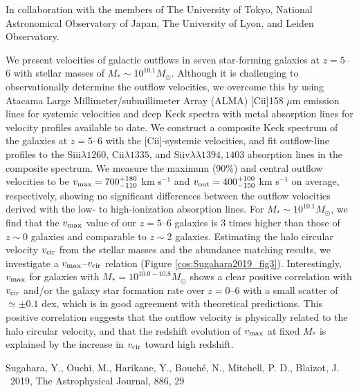 \noindent
In collaboration with the members of
\noindent
The University of Tokyo, 
National Astronomical Observatory of Japan, 
The University of Lyon, 
and 
Leiden Observatory. 

\vspace{10pt}

We present velocities of galactic outflows in seven star-forming galaxies at $z=5$--$6$ 
with stellar masses of $M_\ast \sim10^{10.1} M_\odot$. 
Although it is challenging to observationally determine the outflow velocities, 
we overcome this by using 
Atacama Large Millimeter/submillimeter Array (ALMA)
[{\sc Cii}]158 $\mu$m emission lines for systemic velocities 
and deep Keck spectra with metal absorption lines for velocity profiles available to date. 
We construct a composite Keck spectrum of the galaxies at $z=5$--$6$ 
with the [{\sc Cii}]-systemic velocities, 
and fit outflow-line profiles to the Si{\sc ii}$\lambda1260$, C{\sc ii}$\lambda1335$, 
and Si{\sc iv}$\lambda\lambda1394,1403$ absorption lines in the composite spectrum. 
We measure the maximum (90\%) and central outflow velocities to be 
$v_{\rm max} = 700^{+180}_{-110}$ km s$^{-1}$ 
and $v_{\rm out} = 400^{+100}_{-150}$ km s$^{-1}$ on average, respectively, 
showing no significant differences between the outflow velocities 
derived with the low- to high-ionization absorption lines. 
For $M_\ast \sim10^{10.1} M_\odot$, 
we find that the $v_{\rm max}$ value of our $z=5$--$6$ galaxies is 3 times higher 
than those of $z\sim0$ galaxies and comparable to $z\sim2$ galaxies. 
Estimating the halo circular velocity $v_{\rm cir}$ from the stellar masses and the abundance matching results, 
we investigate a $v_{\rm max}$--$v_{\rm cir}$ relation (Figure \ref{cos:Sugahara2019_fig3}). 
Interestingly, $v_{\rm max}$ for galaxies with $M_\ast = 10^{10.0-10.8} M_\odot$ shows 
a clear positive correlation with $v_{\rm cir}$ and/or the galaxy star formation rate over $z=0$--$6$ 
with a small scatter of $\simeq \pm 0.1$ dex, 
which is in good agreement with theoretical predictions. 
This positive correlation suggests that the outflow velocity is physically related to the halo circular velocity, 
and that the redshift evolution of $v_{\rm max}$ at fixed $M_\ast$ 
is explained by the increase in $v_{\rm cir}$ toward high redshift.



\begin{thebibliography}{9}
 Sugahara, Y., Ouchi, M., Harikane, Y., Bouch\'e, N., Mitchell, P. D., Blaizot, J. 
 \ 2019, 
The Astrophysical Journal, 886, 29 
\end{thebibliography}


